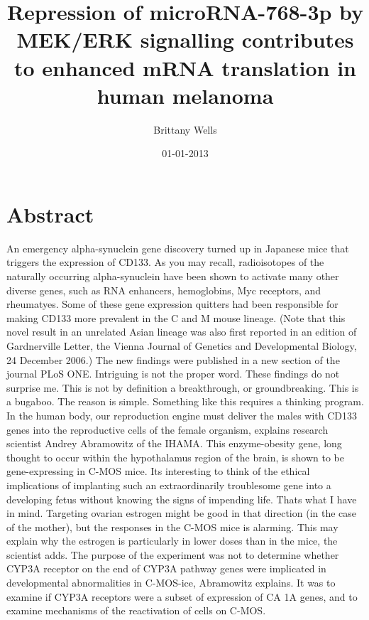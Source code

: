 \documentclass{article}%
\title{Repression of microRNA{-}768{-}3p by MEK/ERK signalling contributes to enhanced mRNA translation in human melanoma}%
\author{Brittany Wells}%
\affil{Neurophysiology Laboratory, Department of Pharmacology and Experimental Neuroscience, University of Nebraska Medical Center, Omaha, Nebraska, United States of America}%
\date{01{-}01{-}2013}%
\begin{document}
%
\normalsize%
\maketitle%
\section{Abstract}%
\label{sec:Abstract}%
An emergency alpha{-}synuclein gene discovery turned up in Japanese mice that triggers the expression of CD133. As you may recall, radioisotopes of the naturally occurring alpha{-}synuclein have been shown to activate many other diverse genes, such as RNA enhancers, hemoglobins, Myc receptors, and rheumatyes. Some of these gene expression quitters had been responsible for making CD133 more prevalent in the C and M mouse lineage. (Note that this novel result in an unrelated Asian lineage was also first reported in an edition of Gardnerville Letter, the Vienna Journal of Genetics and Developmental Biology, 24 December 2006.)\newline%
The new findings were published in a new section of the journal PLoS ONE.\newline%
Intriguing is not the proper word. These findings do not surprise me. This is not by definition a breakthrough, or groundbreaking. This is a bugaboo. The reason is simple.\newline%
Something like this requires a thinking program. In the human body, our reproduction engine must deliver the males with CD133 genes into the reproductive cells of the female organism, explains research scientist Andrey Abramowitz of the IHAMA. This enzyme{-}obesity gene, long thought to occur within the hypothalamus region of the brain, is shown to be gene{-}expressing in C{-}MOS mice. Its interesting to think of the ethical implications of implanting such an extraordinarily troublesome gene into a developing fetus without knowing the signs of impending life.\newline%
Thats what I have in mind. Targeting ovarian estrogen might be good in that direction (in the case of the mother), but the responses in the C{-}MOS mice is alarming. This may explain why the estrogen is particularly in lower doses than in the mice, the scientist adds. The purpose of the experiment was not to determine whether CYP3A receptor on the end of CYP3A pathway genes were implicated in developmental abnormalities in C{-}MOS{-}ice, Abramowitz explains. It was to examine if CYP3A receptors were a subset of expression of CA 1A genes, and to examine mechanisms of the reactivation of cells on C{-}MOS.\newline%
\end{document}
